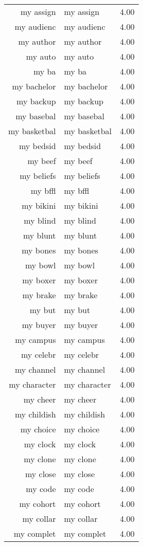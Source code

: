 \begin{table}[ht]
\begin{tabular}{rlr}
  my assign & my assign & 4.00 \\ 
  my audienc & my audienc & 4.00 \\ 
  my author & my author & 4.00 \\ 
  my auto & my auto & 4.00 \\ 
  my ba & my ba & 4.00 \\ 
  my bachelor & my bachelor & 4.00 \\ 
  my backup & my backup & 4.00 \\ 
  my basebal & my basebal & 4.00 \\ 
  my basketbal & my basketbal & 4.00 \\ 
  my bedsid & my bedsid & 4.00 \\ 
  my beef & my beef & 4.00 \\ 
  my beliefs & my beliefs & 4.00 \\ 
  my bffl & my bffl & 4.00 \\ 
  my bikini & my bikini & 4.00 \\ 
  my blind & my blind & 4.00 \\ 
  my blunt & my blunt & 4.00 \\ 
  my bones & my bones & 4.00 \\ 
  my bowl & my bowl & 4.00 \\ 
  my boxer & my boxer & 4.00 \\ 
  my brake & my brake & 4.00 \\ 
  my but & my but & 4.00 \\ 
  my buyer & my buyer & 4.00 \\ 
  my campus & my campus & 4.00 \\ 
  my celebr & my celebr & 4.00 \\ 
  my channel & my channel & 4.00 \\ 
  my character & my character & 4.00 \\ 
  my cheer & my cheer & 4.00 \\ 
  my childish & my childish & 4.00 \\ 
  my choice & my choice & 4.00 \\ 
  my clock & my clock & 4.00 \\ 
  my clone & my clone & 4.00 \\ 
  my close & my close & 4.00 \\ 
  my code & my code & 4.00 \\ 
  my cohort & my cohort & 4.00 \\ 
  my collar & my collar & 4.00 \\ 
  my complet & my complet & 4.00 \\ 

\end{tabular}
\end{table}
